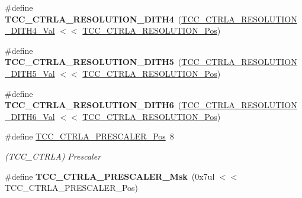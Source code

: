 \begin{DoxyCompactItemize}
\item 
\hypertarget{group___s_a_m_l21___t_c_c_ga1b787136dd44f198cb10c4c2b1d06781}{}\#define {\bfseries T\+C\+C\+\_\+\+C\+T\+R\+L\+A\+\_\+\+R\+E\+S\+O\+L\+U\+T\+I\+O\+N\+\_\+\+D\+I\+T\+H4}~(\hyperlink{group___s_a_m_l21___t_c_c_gafc06d15e640e4ce043901b2df809f393}{T\+C\+C\+\_\+\+C\+T\+R\+L\+A\+\_\+\+R\+E\+S\+O\+L\+U\+T\+I\+O\+N\+\_\+\+D\+I\+T\+H4\+\_\+\+Val} $<$$<$ \hyperlink{group___s_a_m_l21___t_c_c_gaae5fd9846d9468fd2d0bbf8748e2a39b}{T\+C\+C\+\_\+\+C\+T\+R\+L\+A\+\_\+\+R\+E\+S\+O\+L\+U\+T\+I\+O\+N\+\_\+\+Pos})\label{group___s_a_m_l21___t_c_c_ga1b787136dd44f198cb10c4c2b1d06781}

\item 
\hypertarget{group___s_a_m_l21___t_c_c_gabeb6853872c469f3215946f718d699df}{}\#define {\bfseries T\+C\+C\+\_\+\+C\+T\+R\+L\+A\+\_\+\+R\+E\+S\+O\+L\+U\+T\+I\+O\+N\+\_\+\+D\+I\+T\+H5}~(\hyperlink{group___s_a_m_l21___t_c_c_ga75ab113184814bd3c94ff8593965e2c4}{T\+C\+C\+\_\+\+C\+T\+R\+L\+A\+\_\+\+R\+E\+S\+O\+L\+U\+T\+I\+O\+N\+\_\+\+D\+I\+T\+H5\+\_\+\+Val} $<$$<$ \hyperlink{group___s_a_m_l21___t_c_c_gaae5fd9846d9468fd2d0bbf8748e2a39b}{T\+C\+C\+\_\+\+C\+T\+R\+L\+A\+\_\+\+R\+E\+S\+O\+L\+U\+T\+I\+O\+N\+\_\+\+Pos})\label{group___s_a_m_l21___t_c_c_gabeb6853872c469f3215946f718d699df}

\item 
\hypertarget{group___s_a_m_l21___t_c_c_gac426a852dee1a0d466dfaceb0e385f34}{}\#define {\bfseries T\+C\+C\+\_\+\+C\+T\+R\+L\+A\+\_\+\+R\+E\+S\+O\+L\+U\+T\+I\+O\+N\+\_\+\+D\+I\+T\+H6}~(\hyperlink{group___s_a_m_l21___t_c_c_gafb54b3d1509f6c3aab88130b33862b6c}{T\+C\+C\+\_\+\+C\+T\+R\+L\+A\+\_\+\+R\+E\+S\+O\+L\+U\+T\+I\+O\+N\+\_\+\+D\+I\+T\+H6\+\_\+\+Val} $<$$<$ \hyperlink{group___s_a_m_l21___t_c_c_gaae5fd9846d9468fd2d0bbf8748e2a39b}{T\+C\+C\+\_\+\+C\+T\+R\+L\+A\+\_\+\+R\+E\+S\+O\+L\+U\+T\+I\+O\+N\+\_\+\+Pos})\label{group___s_a_m_l21___t_c_c_gac426a852dee1a0d466dfaceb0e385f34}

\item 
\hypertarget{group___s_a_m_l21___t_c_c_ga32250640d272bee4d7ef7ef16fd8d97d}{}\#define \hyperlink{group___s_a_m_l21___t_c_c_ga32250640d272bee4d7ef7ef16fd8d97d}{T\+C\+C\+\_\+\+C\+T\+R\+L\+A\+\_\+\+P\+R\+E\+S\+C\+A\+L\+E\+R\+\_\+\+Pos}~8\label{group___s_a_m_l21___t_c_c_ga32250640d272bee4d7ef7ef16fd8d97d}

\begin{DoxyCompactList}\small\item\em (T\+C\+C\+\_\+\+C\+T\+R\+L\+A) Prescaler \end{DoxyCompactList}\item 
\hypertarget{group___s_a_m_l21___t_c_c_gac87fa356905a35b58199b6c295f56e20}{}\#define {\bfseries T\+C\+C\+\_\+\+C\+T\+R\+L\+A\+\_\+\+P\+R\+E\+S\+C\+A\+L\+E\+R\+\_\+\+Msk}~(0x7ul $<$$<$ T\+C\+C\+\_\+\+C\+T\+R\+L\+A\+\_\+\+P\+R\+E\+S\+C\+A\+L\+E\+R\+\_\+\+Pos)\label{group___s_a_m_l21___t_c_c_gac87fa356905a35b58199b6c295f56e20}


\end{DoxyCompactItemize}
